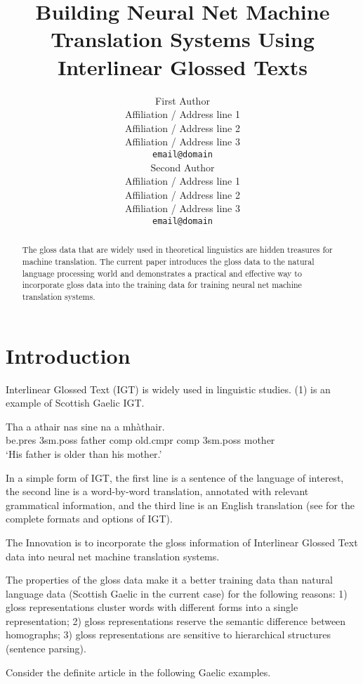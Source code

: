 \documentclass[11pt,a4paper]{article}
\title{Building Neural Net Machine Translation Systems Using Interlinear Glossed Texts}
\author{First Author \\
  Affiliation / Address line 1 \\
  Affiliation / Address line 2 \\
  Affiliation / Address line 3 \\
  {\tt email@domain} \\\And
  Second Author \\
  Affiliation / Address line 1 \\
  Affiliation / Address line 2 \\
  Affiliation / Address line 3 \\
  {\tt email@domain} \\}
\date{}
\begin{document}
\maketitle


\begin{abstract}
  The gloss data that are widely used in theoretical linguistics are hidden treasures for machine translation. 
  The current paper introduces the gloss data to the natural language processing world and demonstrates a practical and effective way to incorporate gloss data into the training data for training neural net machine translation systems. 
\end{abstract}

\section{Introduction}
Interlinear Glossed Text (IGT) is widely used in linguistic studies. (1)  is an example of Scottish Gaelic IGT.
\begin{exe}  
\ex \gll    Tha a athair nas sine na a mh\`athair.\\  
            be.pres 3sm.poss father comp old.cmpr comp 3sm.poss mother
\\  
    \glt    `His father is older than his mother.'  
\end{exe}

In a simple form of IGT, the first line is a sentence of the language of interest, the second line is a word-by-word translation, annotated with relevant grammatical information, and the third line is an English translation (see \citet{bickel2008leipzig} for the complete formats and options of IGT).  

The Innovation is to incorporate the gloss information of Interlinear Glossed Text data into neural net machine translation systems.

The properties of the gloss data make it a better training data than natural language data (Scottish Gaelic in the current case) for the following reasons: 1) gloss representations cluster words with different forms into a single representation; 2) gloss representations reserve the semantic difference between homographs; 3) gloss representations are sensitive to hierarchical structures (sentence parsing). 

Consider the definite article in the following Gaelic examples. 
\end{document}
